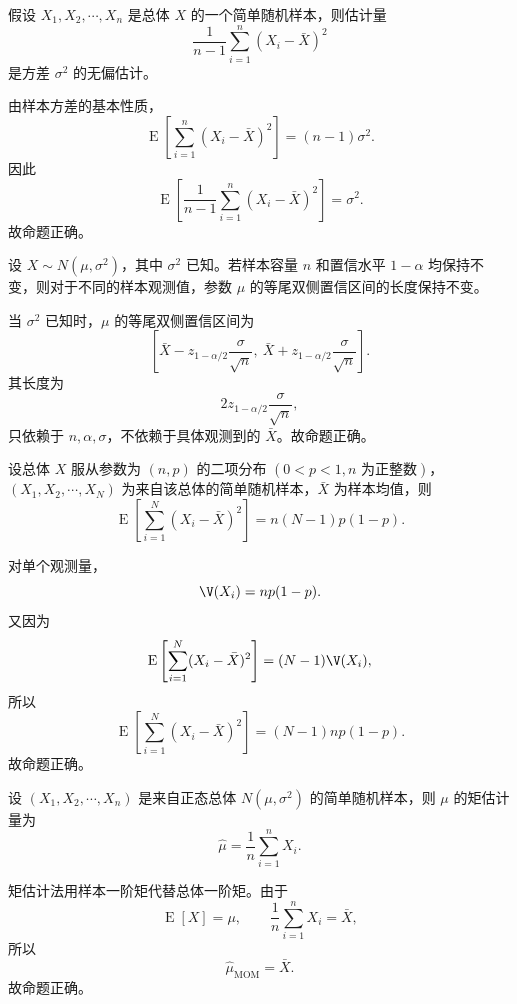 \begin{question}
假设 $X_1,X_2,\cdots,X_n$ 是总体 $X$ 的一个简单随机样本，则估计量
\[
\frac{1}{n-1}\sum_{i=1}^n(X_i-\bar X)^2
\]
是方差 $\sigma^2$ 的无偏估计。
\begin{solution}
由样本方差的基本性质，
\[
\operatorname{E}\left[\sum_{i=1}^n(X_i-\bar X)^2\right]=(n-1)\sigma^2.
\]
因此
\[
\operatorname{E}\left[\frac{1}{n-1}\sum_{i=1}^n(X_i-\bar X)^2\right]=\sigma^2.
\]
故命题正确。
\end{solution}
\end{question}

\begin{question}
设 $X\sim N(\mu,\sigma^2)$，其中 $\sigma^2$ 已知。若样本容量 $n$ 和置信水平 $1-\alpha$ 均保持不变，则对于不同的样本观测值，参数 $\mu$ 的等尾双侧置信区间的长度保持不变。
\begin{solution}
当 $\sigma^2$ 已知时，$\mu$ 的等尾双侧置信区间为
\[
\left[\bar X-z_{1-\alpha/2}\frac{\sigma}{\sqrt n},\
\bar X+z_{1-\alpha/2}\frac{\sigma}{\sqrt n}\right].
\]
其长度为
\[
2z_{1-\alpha/2}\frac{\sigma}{\sqrt n},
\]
只依赖于 $n,\alpha,\sigma$，不依赖于具体观测到的 $\bar X$。故命题正确。
\end{solution}
\end{question}

\begin{question}
设总体 $X$ 服从参数为 $(n,p)$ 的二项分布 $(0<p<1,n\text{ 为正整数})$，$(X_1,X_2,\cdots,X_N)$ 为来自该总体的简单随机样本，$\bar X$ 为样本均值，则
\[
\operatorname{E}\left[\sum_{i=1}^N(X_i-\bar X)^2\right]=n(N-1)p(1-p).
\]
\begin{solution}
对单个观测量，
\[
\V(X_i)=np(1-p).
\]
又因为
\[
\operatorname{E}\left[\sum_{i=1}^N(X_i-\bar X)^2\right]=(N-1)\V(X_i),
\]
所以
\[
\operatorname{E}\left[\sum_{i=1}^N(X_i-\bar X)^2\right]
=(N-1)np(1-p).
\]
故命题正确。
\end{solution}
\end{question}

\begin{question}
设 $(X_1,X_2,\cdots,X_n)$ 是来自正态总体 $N(\mu,\sigma^2)$ 的简单随机样本，则 $\mu$ 的矩估计量为
\[
\hat\mu=\frac1n\sum_{i=1}^nX_i.
\]
\begin{solution}
矩估计法用样本一阶矩代替总体一阶矩。由于
\[
\operatorname{E}[X]=\mu,
\qquad
\frac1n\sum_{i=1}^nX_i=\bar X,
\]
所以
\[
\hat\mu_{\mathrm{MOM}}=\bar X.
\]
故命题正确。
\anstext{正确}
\end{solution}
\end{question}

